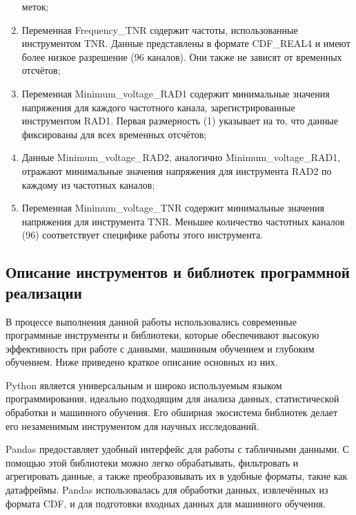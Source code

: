 \documentclass[spec, och, diploma]{SCWorks}
\begin{document}
\begin{enumerate}
            меток;
            \item Переменная Frequency_TNR содержит частоты, использованные
            инструментом TNR. Данные представлены в формате CDF_REAL4 и имеют
            более низкое разрешение (96 каналов). Они также не зависят от
            временных отсчётов;
            \item Переменная Minimum_voltage_RAD1 содержит минимальные значения
            напряжения для каждого частотного канала, зарегистрированные
            инструментом RAD1. Первая размерность (1) указывает на то, что
            данные фиксированы для всех временных отсчётов;
            \item Данные Minimum_voltage_RAD2, аналогично Minimum_voltage_RAD1,\\
            отражают минимальные значения напряжения для инструмента RAD2 по
            каждому из частотных каналов;
            \item Переменная Minimum_voltage_TNR содержит минимальные значения
            напряжения для инструмента TNR. Меньшее количество частотных каналов
            (96) соответствует специфике работы этого инструмента.
        \end{enumerate}

    \subsection{Описание инструментов и библиотек программной реализации}

        В процессе выполнения данной работы использовались современные
        программные инструменты и библиотеки, которые обеспечивают высокую
        эффективность при работе с данными, машинным обучением и глубоким
        обучением. Ниже приведено краткое описание основных из них.

        Python является универсальным и широко используемым языком
        программирования, идеально подходящим для анализа данных, статистической
        обработки и машинного обучения. Его обширная экосистема библиотек делает
        его незаменимым инструментом для научных исследований. \cite{python}

        Pandas предоставляет удобный интерфейс для работы с табличными данными.
        С помощью этой библиотеки можно легко обрабатывать, фильтровать и
        агрегировать данные, а также преобразовывать их в удобные форматы, такие
        как датафреймы. Pandas использовалась для обработки данных, извлечённых
        из формата CDF, и для подготовки входных данных для машинного обучения.
        \cite{fwpandas}
\end{document}
